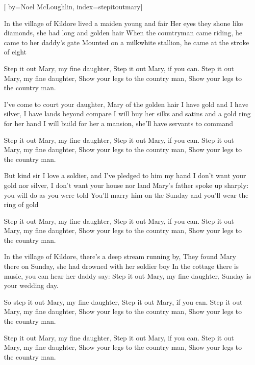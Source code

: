 
[%
    by={Noel McLoughlin},
    index={stepitoutmary}]


    \label{stepitoutmary}

    \beginverse
        In the village of Kildore lived a maiden young and fair
        Her eyes they shone like diamonds, she had long and golden hair
        When the countryman came riding, he came to her daddy's gate
        Mounted on a milkwhite stallion, he came at the stroke of eight
    \endverse

    \beginchorus
        Step it out Mary, my fine daughter,
        Step it out Mary, if you can.
        Step it out Mary, my fine daughter,
        Show your legs to the country man,
        Show your legs to the country man.
    \endchorus

    \beginverse
        I've come to court your daughter, Mary of the golden hair
        I have gold and I have silver, I have lands beyond compare
        I will buy her silks and satins and a gold ring for her hand
        I will build for her a mansion, she'll have servants to command
    \endverse

    \beginchorus
        Step it out Mary, my fine daughter,
        Step it out Mary, if you can.
        Step it out Mary, my fine daughter,
        Show your legs to the country man,
        Show your legs to the country man.
    \endchorus

    \beginverse
        But kind sir I love a soldier, and I've pledged to him my hand
        I don't want your gold nor silver, I don't want your house nor land
        Mary's father spoke up sharply: you will do as you were told
        You'll marry him on the Sunday and you'll wear the ring of gold
    \endverse

    \beginchorus
        Step it out Mary, my fine daughter,
        Step it out Mary, if you can.
        Step it out Mary, my fine daughter,
        Show your legs to the country man,
        Show your legs to the country man.
    \endchorus

    \beginverse
        In the village of Kildore, there's a deep stream running by,
        They found Mary there on Sunday, she had drowned with her soldier boy
        In the cottage there is music, you can hear her daddy say:
        Step it out Mary, my fine daughter, Sunday is your wedding day.
    \endverse

    \beginchorus
        So step it out Mary, my fine daughter,
        Step it out Mary, if you can.
        Step it out Mary, my fine daughter,
        Show your legs to the country man,
        Show your legs to the country man.
    \endchorus

    \beginchorus
        Step it out Mary, my fine daughter,
        Step it out Mary, if you can.
        Step it out Mary, my fine daughter,
        Show your legs to the country man,
        Show your legs to the country man.
    \endchorus
\endsong
